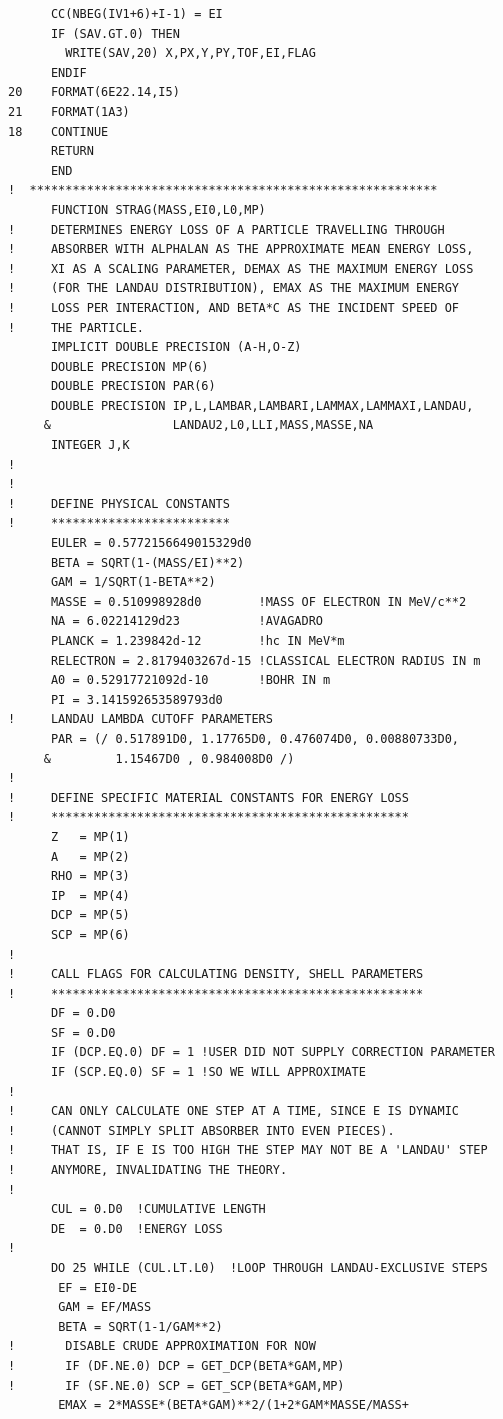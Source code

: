 \begin{lstlisting}
      CC(NBEG(IV1+6)+I-1) = EI
      IF (SAV.GT.0) THEN
        WRITE(SAV,20) X,PX,Y,PY,TOF,EI,FLAG
      ENDIF
20    FORMAT(6E22.14,I5)
21    FORMAT(1A3)
18    CONTINUE
      RETURN
      END
!  *********************************************************
      FUNCTION STRAG(MASS,EI0,L0,MP)
!     DETERMINES ENERGY LOSS OF A PARTICLE TRAVELLING THROUGH
!     ABSORBER WITH ALPHALAN AS THE APPROXIMATE MEAN ENERGY LOSS,
!     XI AS A SCALING PARAMETER, DEMAX AS THE MAXIMUM ENERGY LOSS
!     (FOR THE LANDAU DISTRIBUTION), EMAX AS THE MAXIMUM ENERGY 
!     LOSS PER INTERACTION, AND BETA*C AS THE INCIDENT SPEED OF 
!     THE PARTICLE.
      IMPLICIT DOUBLE PRECISION (A-H,O-Z)
      DOUBLE PRECISION MP(6)
      DOUBLE PRECISION PAR(6)
      DOUBLE PRECISION IP,L,LAMBAR,LAMBARI,LAMMAX,LAMMAXI,LANDAU,
     &                 LANDAU2,L0,LLI,MASS,MASSE,NA
      INTEGER J,K
!
!
!     DEFINE PHYSICAL CONSTANTS
!     *************************
      EULER = 0.5772156649015329d0
      BETA = SQRT(1-(MASS/EI)**2)
      GAM = 1/SQRT(1-BETA**2)
      MASSE = 0.510998928d0        !MASS OF ELECTRON IN MeV/c**2
      NA = 6.02214129d23           !AVAGADRO
      PLANCK = 1.239842d-12        !hc IN MeV*m
      RELECTRON = 2.8179403267d-15 !CLASSICAL ELECTRON RADIUS IN m
      A0 = 0.52917721092d-10       !BOHR IN m
      PI = 3.141592653589793d0      
!     LANDAU LAMBDA CUTOFF PARAMETERS
      PAR = (/ 0.517891D0, 1.17765D0, 0.476074D0, 0.00880733D0, 
     &         1.15467D0 , 0.984008D0 /)
!
!     DEFINE SPECIFIC MATERIAL CONSTANTS FOR ENERGY LOSS
!     **************************************************
      Z   = MP(1)
      A   = MP(2)
      RHO = MP(3)
      IP  = MP(4)
      DCP = MP(5)
      SCP = MP(6)
!
!     CALL FLAGS FOR CALCULATING DENSITY, SHELL PARAMETERS
!     ****************************************************
      DF = 0.D0
      SF = 0.D0
      IF (DCP.EQ.0) DF = 1 !USER DID NOT SUPPLY CORRECTION PARAMETER
      IF (SCP.EQ.0) SF = 1 !SO WE WILL APPROXIMATE
!      
!     CAN ONLY CALCULATE ONE STEP AT A TIME, SINCE E IS DYNAMIC
!     (CANNOT SIMPLY SPLIT ABSORBER INTO EVEN PIECES).
!     THAT IS, IF E IS TOO HIGH THE STEP MAY NOT BE A 'LANDAU' STEP
!     ANYMORE, INVALIDATING THE THEORY.
!
      CUL = 0.D0  !CUMULATIVE LENGTH
      DE  = 0.D0  !ENERGY LOSS
!
      DO 25 WHILE (CUL.LT.L0)  !LOOP THROUGH LANDAU-EXCLUSIVE STEPS
       EF = EI0-DE
       GAM = EF/MASS
       BETA = SQRT(1-1/GAM**2)
!       DISABLE CRUDE APPROXIMATION FOR NOW
!       IF (DF.NE.0) DCP = GET_DCP(BETA*GAM,MP)
!       IF (SF.NE.0) SCP = GET_SCP(BETA*GAM,MP)
       EMAX = 2*MASSE*(BETA*GAM)**2/(1+2*GAM*MASSE/MASS+

\end{lstlisting}

